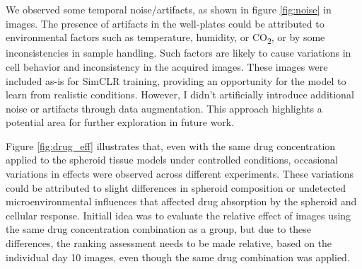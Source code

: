 We observed some temporal noise/artifacts, as shown in figure  \ref{fig:noise} in images. The presence of artifacts in the well-plates could be attributed to environmental factors such
as temperature, humidity, or CO\textsubscript{2}, or by some inconsistencies in sample handling. Such factors are likely to cause variations in cell behavior and
inconsistency in the  acquired images. These images were included as-is for SimCLR training, providing an opportunity for the model to learn from realistic conditions. 
However, I didn't artificially introduce additional noise or artifacts through data augmentation. This approach highlights a potential area for further exploration in future work. 

Figure \ref{fig:drug_eff} illustrates that, even with the same drug concentration applied to the spheroid tissue models under controlled conditions, occasional variations in effects were observed across different experiments. These variations could be attributed to slight differences in spheroid composition or undetected microenvironmental influences that affected drug absorption by the spheroid and cellular response. Initiall idea was to evaluate the relative effect of images using the same drug concentration combination as a group, but due to these differences, the ranking assessment needs to be made relative, based on the individual day 10 images, even though the same drug combination was applied.

